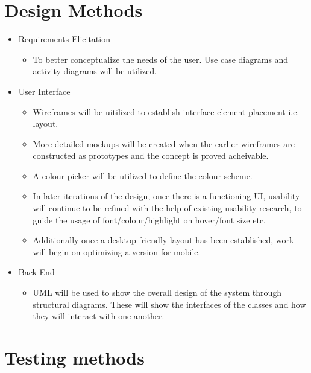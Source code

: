 \section{Design Methods}
   \begin{itemize}
     \item Requirements Elicitation
     \begin{itemize}
       \item To better conceptualize the needs of the user. Use case diagrams and activity diagrams will be utilized.
     \end{itemize}
     \item User Interface
     \begin{itemize}
       \item Wireframes will be uitilized to establish interface element placement i.e. layout.
       \item More detailed mockups will be created when the earlier wireframes are constructed as prototypes and the concept is proved acheivable.
       \item A colour picker will be utilized to define the colour scheme.
       \item In later iterations of the design, once there is a functioning UI,
       usability will continue to be refined with the help of existing usability research,
       to guide the usage of font/colour/highlight on hover/font size etc.
       \item Additionally once a desktop friendly layout has been established, work will begin on optimizing a version for mobile.
     \end{itemize}
     \item Back-End
     \begin{itemize}
       \item UML will be used to show the overall design of the system through structural diagrams. These will show the interfaces of the classes and how they will interact with one another.
     \end{itemize}
   \end{itemize}

\section{Testing methods}

